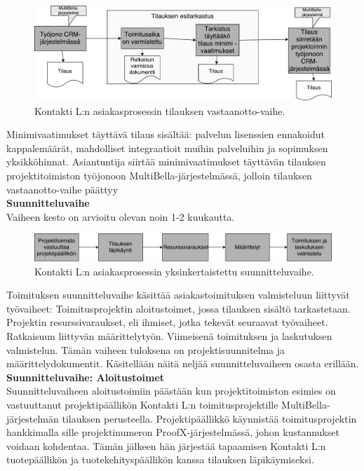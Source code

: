 \documentclass[finnish,12pt,a4paper,pdftex]{article}
\begin{document}
\begin{figure}[!h]
    \centering
    \includegraphics[scale=0.4]{images/tilvast.pdf}
    \caption{Kontakti L:n asiakasprosessin tilauksen vastaanotto-vaihe.}
    \label{fig:tilausvast}
\end{figure}

Minimivaatimukset täyttävä tilaus sisältää: palvelun lisenssien ennakoidut kappalemäärät, mahdolliset integraatioit muihin palveluihin ja sopimuksen yksikköhinnat. Asiantuntija siirtää minimivaatimukset täyttävän tilauksen projektitoimiston työjonoon MultiBella-järjestelmässä, jolloin tilauksen vastaanotto-vaihe päättyy\\

\textbf{Suunnitteluvaihe}\\

Vaiheen kesto on arvioitu olevan noin 1-2 kuukautta.\\

\begin{figure}[!h]
    \centering
    \includegraphics[scale=0.35]{images/ykssuunn.pdf}
    \caption{Kontakti L:n asiakasprosessin yksinkertaistettu suunnitteluvaihe.}
    \label{fig:ykssuun}
\end{figure}

Toimituksen suunnitteluvaihe käsittää asiakastoimituksen valmisteluun liittyvät työvaiheet: Toimitusprojektin aloitustoimet, jossa tilauksen sisältö tarkastetaan. Projektin resurssivaraukset, eli ihmiset, jotka tekevät seuraavat työvaiheet. Ratkaisuun liittyvän määrittelytyön. Viimeisenä toimituksen ja laskutuksen valmistelun. Tämän vaiheen tuloksena on projektisuunnitelma ja määrittelydokumentit. Käsitellään näitä neljää suunnitteluvaiheen osasta erillään.\\

\textbf{Suunnitteluvaihe: Aloitustoimet}\\

Suunnitteluvaiheen aloitustoimiin päästään kun projektitoimiston esimies on vastuuttanut projektipäällikön Kontakti L:n toimitusprojektille MultiBella-järjestelmän tilauksen perusteella. Projektipäällikkö käynnistää toimitusprojektin hankkimalla sille projektinumeron ProofX-järjestelmässä, johon kustannukset voidaan kohdentaa. Tämän jälkeen hän järjestää tapaamisen Kontakti L:n tuotepäällikön ja tuotekehityspäällikön kanssa tilauksen läpikäymiseksi. \\
\end{document}
